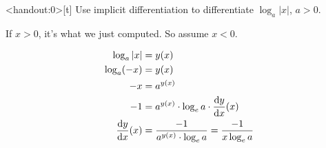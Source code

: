 \begin{frame}<handout:0>[t]
Use implicit differentiation to differentiate $\log_a|x|$, $a>0$.\pause
\color{answercolor}\vfill

If $x>0$, it's what we just computed. So assume $x<0$.

\begin{align*}
\log_a |x| &= y(x)\\
\log_a (-x) &= y(x)\\
-x&=a^{y(x)}\\
-1&=a^{y(x)} \cdot \log_e a \cdot \frac{\text{d}y}{\text{d}x}(x)\\
\frac{\text{d}y}{\text{d}x}(x)&=\frac{-1}{a^{y(x)} \cdot \log_e a} = \frac{-1}{x\log_e a}
\end{align*}

\end{frame}

